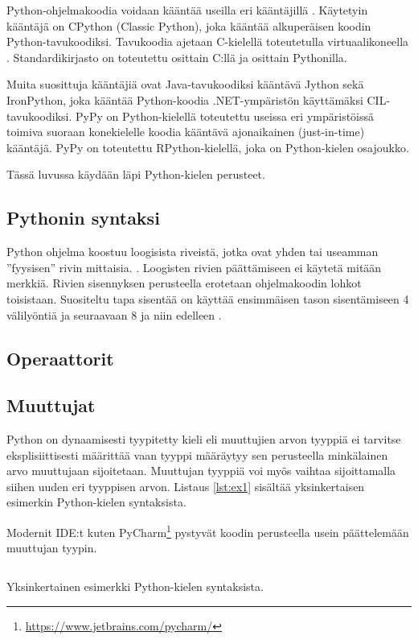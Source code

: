 \documentclass[finnish]{tktltiki2}
\theoremstyle{definition}
\theoremstyle{remark}
\begin{document}
Python-ohjelmakoodia voidaan kääntää useilla eri kääntäjillä \cite{martelli2006python}. Käytetyin kääntäjä on CPython (Classic Python), joka kääntää alkuperäisen koodin Python-tavukoodiksi. Tavukoodia ajetaan C-kielellä toteutetulla virtuaalikoneella \cite{martelli2006python}. Standardikirjasto on toteutettu osittain C:llä ja osittain Pythonilla.

Muita suosittuja kääntäjiä ovat Java-tavukoodiksi kääntävä Jython sekä IronPython, joka kääntää Python-koodia .NET-ympäristön käyttämäksi CIL-tavukoodiksi. PyPy on Python-kielellä toteutettu useissa eri ympäristöissä toimiva suoraan konekielelle koodia kääntävä ajonaikainen (just-in-time) kääntäjä. PyPy on toteutettu RPython-kielellä, joka on Python-kielen osajoukko.

Tässä luvussa käydään läpi Python-kielen perusteet.

\subsection{Pythonin syntaksi}

Python ohjelma koostuu loogisista riveistä, jotka ovat yhden tai useamman ''fyysisen'' rivin mittaisia. \cite{martelli2006python}. Loogisten rivien päättämiseen ei käytetä mitään merkkiä. Rivien sisennyksen perusteella erotetaan ohjelmakoodin lohkot toisistaan. Suositeltu tapa sisentää on käyttää ensimmäisen tason sisentämiseen 4 välilyöntiä ja seuraavaan 8 ja niin edelleen \cite{pep8}. 

\subsection{Operaattorit}

\subsection{Muuttujat}

Python on dynaamisesti tyypitetty kieli eli muuttujien arvon tyyppiä ei tarvitse eksplisiittisesti määrittää vaan tyyppi määräytyy sen perusteella minkälainen arvo muuttujaan sijoitetaan. Muuttujan tyyppiä voi myös vaihtaa sijoittamalla siihen uuden eri tyyppisen arvon. Listaus \ref{lst:ex1} sisältää yksinkertaisen esimerkin Python-kielen syntaksista.

Modernit IDE:t kuten PyCharm\footnote{\url{https://www.jetbrains.com/pycharm/}} pystyvät koodin perusteella usein päättelemään muuttujan tyypin.

\begin{listing}
    \inputminted{python}{code/foo.py}
    \label{lst:ex1}
    \caption{Yksinkertainen esimerkki Python-kielen syntaksista.}
\end{listing}
\end{document}
